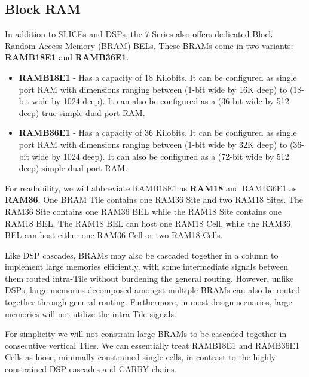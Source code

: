 \documentclass{article}
\begin{document}
        \begin{multicols}{2}


    \newpage

    \subsection{Block RAM}
        In addition to SLICEs and DSPs, the 7-Series also offers dedicated Block Random Access Memory (BRAM) BELs. 
        These BRAMs come in two variants: \textbf{RAMB18E1} and \textbf{RAMB36E1}. 
        \begin{itemize}
            \item \textbf{RAMB18E1} - 
            Has a capacity of 18 Kilobits. 
            It can be configured as single port RAM with dimensions ranging between (1-bit wide by 16K deep) to (18-bit wide by 1024 deep). 
            It can also be configured as a (36-bit wide by 512 deep) true simple dual port RAM. 
            \item \textbf{RAMB36E1} - 
            Has a capacity of 36 Kilobits. 
            It can be configured as single port RAM with dimensions ranging between (1-bit wide by 32K deep) to (36-bit wide by 1024 deep). 
            It can also be configured as a (72-bit wide by 512 deep) simple dual port RAM. 
        \end{itemize}

        For readability, we will abbreviate RAMB18E1 as \textbf{RAM18} and RAMB36E1 as \textbf{RAM36}.
        One BRAM Tile contains one RAM36 Site and two RAM18 Sites. 
        The RAM36 Site contains one RAM36 BEL while the RAM18 Site contains one RAM18 BEL.
        The RAM18 BEL can host one RAM18 Cell, while the RAM36 BEL can host either one RAM36 Cell or two RAM18 Cells. 

        Like DSP cascades, BRAMs may also be cascaded together in a column to implement large memories efficiently, with some intermediate signals between them routed intra-Tile without burdening the general routing. 
        However, unlike DSPs, large memories decomposed amongst multiple BRAMs can also be routed together through general routing. 
        Furthermore, in most design scenarios, large memories will not utilize the intra-Tile signals. 
        
        For simplicity we will not constrain large BRAMs to be cascaded together in consecutive vertical Tiles. 
        We can essentially treat RAMB18E1 and RAMB36E1 Cells as loose, minimally constrained single cells, in contrast to the highly constrained DSP cascades and CARRY chains.


\end{multicols}
\end{document}
